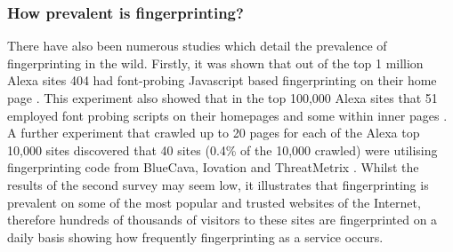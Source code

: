 \documentclass[12pt]{article}
\begin{document}
\subsubsection{How prevalent is fingerprinting?}
There have also been numerous studies which detail the prevalence of fingerprinting in the wild. Firstly, it was shown that out of the top 1 million Alexa sites 404 had font-probing Javascript based fingerprinting on their home page \parencite{dustingFP}. This experiment also showed that in the top 100,000 Alexa sites that 51 employed font probing scripts on their homepages and some within inner pages \parencite{dustingFP}. A further experiment that crawled up to 20 pages for each of the Alexa top 10,000 sites discovered that 40 sites (0.4\% of the 10,000 crawled) were utilising fingerprinting code from BlueCava, Iovation and ThreatMetrix \parencite{cookielessMonster}. Whilst the results of the second survey may seem low, it illustrates that fingerprinting is prevalent on some of the most popular and trusted websites of the Internet, therefore hundreds of thousands of visitors to these sites are fingerprinted on a daily basis \parencite{cookielessMonster} showing how frequently fingerprinting as a service occurs.

\end{document}
